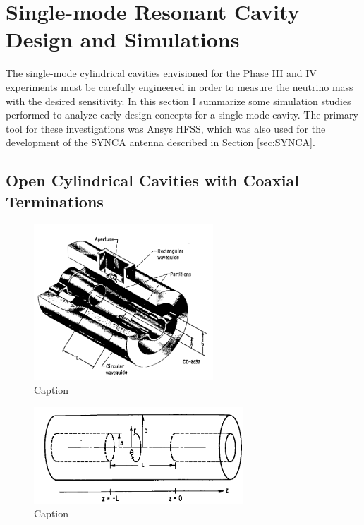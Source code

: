 \section{Single-mode Resonant Cavity Design and Simulations}
\label{sec:chap6-single-mode-cavity-sims}

The single-mode cylindrical cavities envisioned for the Phase III and IV experiments must be carefully engineered in order to measure the neutrino mass with the desired sensitivity. In this section I summarize some simulation studies performed to analyze early design concepts for a single-mode cavity. The primary tool for these investigations was Ansys HFSS, which was also used for the development of the SYNCA antenna described in Section \ref{sec:SYNCA}. 

\subsection{Open Cylindrical Cavities with Coaxial Terminations}

\begin{figure}[htbp]
    \centering
    \includegraphics*[width=0.6\textwidth]{figs/Chapter-6/230606_open_cavity_image.png}
    \caption{Caption}
\end{figure}

\begin{figure}[htbp]
    \centering
    \includegraphics*[width=0.7\textwidth]{figs/Chapter-6/230606_open_cavity_sketch.png}
    \caption{Caption}
\end{figure}

